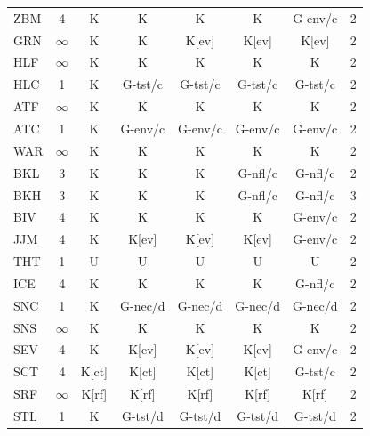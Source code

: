 {\begin{longtable}{@{}lccccccl@{}}
ZBM & 4 & K & K & K & K & G-env/c & 2 \\
GRN & $\infty$ & K & K & K[ev] & K[ev] & K[ev] & 2 \\
HLF & $\infty$ & K & K & K & K & K & 2 \\
HLC & 1 & K & G-tst/c & G-tst/c & G-tst/c & G-tst/c & 2 \\
ATF & $\infty$ & K & K & K & K & K & 2 \\
ATC & 1 & K & G-env/c & G-env/c & G-env/c & G-env/c & 2 \\
WAR & $\infty$ & K & K & K & K & K & 2 \\
BKL & 3 & K & K & K & G-nfl/c & G-nfl/c & 2 \\
BKH & 3 & K & K & K & G-nfl/c & G-nfl/c & 3 \\
BIV & 4 & K & K & K & K & G-env/c & 2 \\
JJM & 4 & K & K[ev] & K[ev] & K[ev] & G-env/c & 2 \\
THT & 1 & U & U & U & U & U & 2 \\
ICE & 4 & K & K & K & K & G-nfl/c & 2 \\
SNC & 1 & K & G-nec/d & G-nec/d & G-nec/d & G-nec/d & 2 \\
SNS & $\infty$ & K & K & K & K & K & 2 \\
SEV & 4 & K & K[ev] & K[ev] & K[ev] & G-env/c & 2 \\
SCT & 4 & K[ct] & K[ct] & K[ct] & K[ct] & G-tst/c & 2 \\
SRF & $\infty$ & K[rf] & K[rf] & K[rf] & K[rf] & K[rf] & 2 \\
STL & 1 & K & G-tst/d & G-tst/d & G-tst/d & G-tst/d & 2 \\
\end{longtable}}
